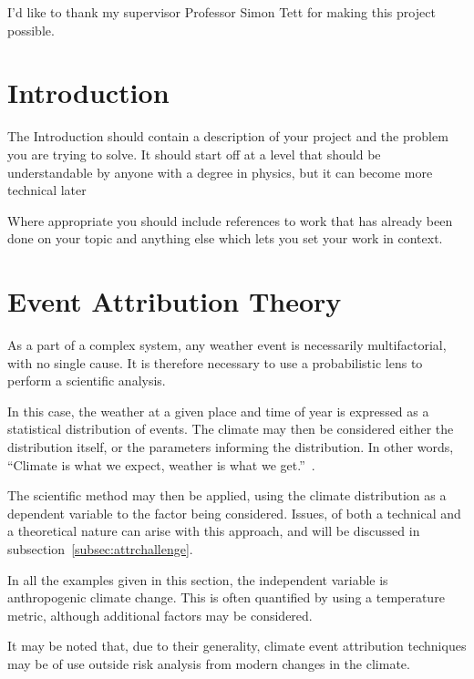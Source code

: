 \documentclass[12pt,a4paper]{report}
\begin{document}
I'd like to thank my supervisor Professor Simon Tett for
making this project possible.



\tableofcontents
\listoftables
\listoffigures


\chapter{Introduction}\label{ch:intro}
The Introduction should contain a description of your project and the
problem you are trying to solve. It should start off at a level that
should be understandable by anyone with a degree in physics, but it
can become more technical later

Where appropriate you should include references to work that has
already been done on your topic and anything else which lets you set
your work in context.


\chapter{Event Attribution Theory}\label{ch:attribution}

As a part of a complex system,
    any weather event is necessarily multifactorial,
    with no single cause.
It is therefore necessary to use a probabilistic lens to perform a scientific analysis.

In this case, the weather at a given place and time of year is expressed as a statistical distribution of events.
The climate may then be considered either the distribution itself,
    or the parameters informing the distribution.
In other words, ``Climate is what we expect, weather is what we get.''~\cite{Herbertson_1935}.

The scientific method may then be applied,
    using the climate distribution as a dependent variable to the factor being considered.
Issues, of both a technical and a theoretical nature can arise with this approach,
    and will be discussed in subsection~\ref{subsec:attrchallenge}.

In all the examples given in this section,
    the independent variable is anthropogenic climate change.
This is often quantified by using a temperature metric,
    although additional factors may be considered.

It may be noted that,
    due to their generality,
    climate event attribution techniques may be of use outside risk analysis from modern changes in the climate.
\end{document}
